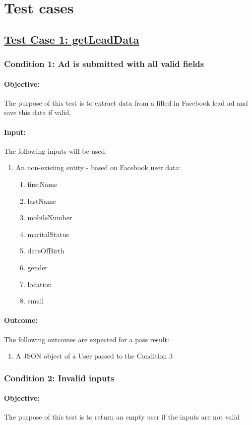\documentclass{article}
\begin{document}
\section{Test cases}
\subsection{\underline{Test Case 1: getLeadData}}\label{test1}
\subsubsection{Condition 1: Ad is submitted with all valid fields }
\paragraph{Objective:} The purpose of this test is to extract data from a filled in Facebook lead ad and save this data if valid.
\paragraph{Input:} The following inputs will be used:
\begin{enumerate}
	\item An non-existing entity - based on Facebook user data:
	\begin{enumerate}
		\item firstName
  		\item lastName
  		\item mobileNumber 
  		\item maritalStatus 
  		\item dateOfBirth 
 		\item gender
  		\item location 
 		\item email	
	\end{enumerate}
\end{enumerate}
\paragraph{Outcome:} The following outcomes are expected for a pass result:
\begin{enumerate}
	\item A JSON object of a User passed to the Condition 3
\end{enumerate}
\subsubsection{Condition 2: Invalid inputs}
\paragraph{Objective:} The purpose of this test is to return an empty user if the inputs are not valid
\end{document}

